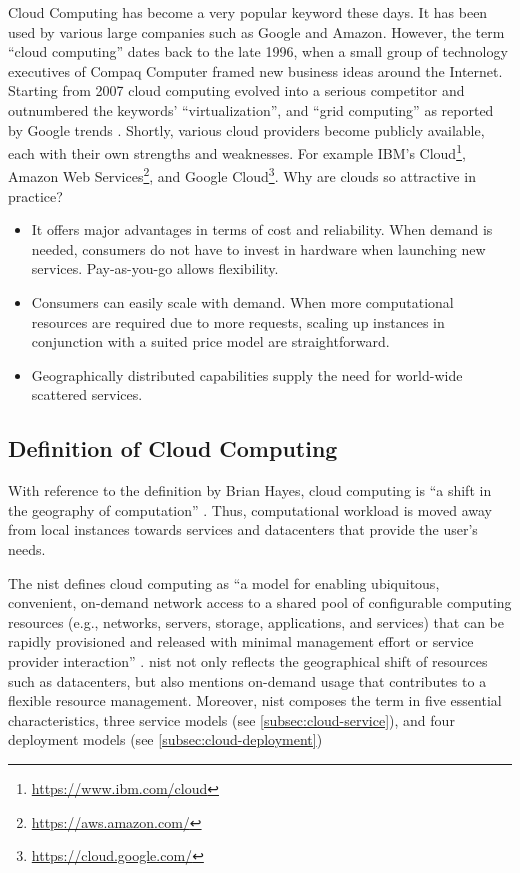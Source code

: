 Cloud Computing has become a very popular keyword these days. 
It has been used by various large companies such as Google and Amazon.
However, the term \enquote{cloud computing} dates back to the late 1996, when a small group of technology executives of Compaq Computer framed new business ideas around the Internet.\cite{regalado2020}
Starting from 2007 cloud computing evolved into a serious competitor and outnumbered the keywords' \enquote{virtualization}, and \enquote{grid computing} as reported by Google trends \cite{Wang2010}.
Shortly, various cloud providers become publicly available, each with their own strengths and weaknesses.
For example IBM's Cloud\footnote{\url{https://www.ibm.com/cloud}}, Amazon Web Services\footnote{\url{https://aws.amazon.com/}}, and Google Cloud\footnote{\url{https://cloud.google.com/}}.
Why are clouds so attractive in practice?

\begin{itemize}
    \item It offers major advantages in terms of cost and reliability.
    When demand is needed, consumers do not have to invest in hardware when launching new services.
    Pay-as-you-go allows flexibility.
    \item Consumers can easily scale with demand.
    When more computational resources are required due to more requests, scaling up instances in conjunction with a suited price model are straightforward.
    \item Geographically distributed capabilities supply the need for world-wide scattered services.
\end{itemize}

\subsection{Definition of Cloud Computing}

With reference to the definition by Brian Hayes, cloud computing is \enquote{a shift in the geography of computation} \cite{hayes2008}.
Thus, computational workload is moved away from local instances towards services and datacenters that provide the user's needs\cite{Armbrust2010}.

The \ac{nist} defines cloud computing as \enquote{a model for enabling ubiquitous, convenient, on-demand network access to a shared pool of configurable computing resources (e.g., networks, servers, storage, applications, and services) that can be rapidly provisioned and released with minimal management effort or service provider interaction} \cite{Mell2011}.
\ac{nist} not only reflects the geographical shift of resources such as datacenters, but also mentions on-demand usage that contributes to a flexible resource management.
Moreover, \ac{nist} composes the term in five essential characteristics, three service models (see \autoref{subsec:cloud-service}), and four deployment models (see \autoref{subsec:cloud-deployment}) \cite{Mell2011}

